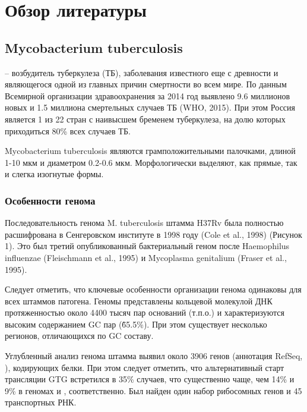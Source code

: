 \section{Обзор литературы}

\subsection{Mycobacterium tuberculosis}
 – возбудитель туберкулеза (ТБ), заболевания известного еще с древности и являющегося одной из главных причин смертности во всем мире. По данным Всемирной организации здравоохранения  за 2014 год выявлено 9.6 миллионов новых и 1.5 миллиона смертельных случаев ТБ (WHO, 2015). При этом Россия является 1 из 22 стран с наивысшем бременем туберкулеза, на долю которых приходиться 80\% всех случаев ТБ. 

Mycobacterium tuberculosis являются грамположительными палочками, длиной 1-10 мкм и диаметром 0.2-0.6 мкм. Морфологически выделяют, как прямые, так и слегка изогнутые формы.

\subsubsection{Особенности генома}
Последовательность генома M. tuberculosis штамма H37Rv была полностью расшифрована в Сенгеровском институте в 1998 году (Cole et al., 1998) (Рисунок 1). Это был третий опубликованный бактериальный геном после Haemophilus influenzae (Fleischmann et al., 1995) и Mycoplasma genitalium (Fraser et al., 1995).

Следует отметить, что ключевые особенности организации генома одинаковы для всех штаммов патогена. Геномы представлены кольцевой молекулой ДНК протяженностью около 4400 тысяч пар оснований (т.п.о.) и характеризуются высоким содержанием GC пар (\~ 65.5\%). При этом существует несколько регионов, отличающихся по GC составу.

Углубленный анализ генома  штамма  выявил около 3906 генов (аннотация RefSeq, ), кодирующих белки. При этом следует отметить, что альтернативный старт трансляции GTG встретился в 35\% случаев, что существенно чаще, чем 14\% и 9\% в геномах  и , соответственно. Был найден один набор рибосомных генов и 45 транспортных РНК.

